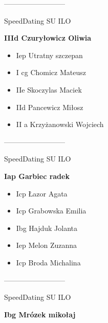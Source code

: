 \documentclass[a4paper,10pt]{article}
\begin{document}
\begin{multicols}{3}
\begin{minipage}[l]{\textwidth}
\begin{itemize}
    \end{itemize}



\end{minipage}



\begin{minipage}[l]{\textwidth}
--------------------------

  \footnotesize{SpeedDating SU ILO}

  \bfseries{IIId Czuryłowicz Oliwia}

  \begin{itemize}
    \item Iep Utratny szczepan
    \item I cg Chomicz Mateusz
    \item IIe Skoczylas Maciek
    \item IId Pancewicz Miłosz
    \item II a Krzyżanowski Wojciech

    \end{itemize}



\end{minipage}



\begin{minipage}[l]{\textwidth}
--------------------------

  \footnotesize{SpeedDating SU ILO}

  \bfseries{Iap Garbiec radek}

  \begin{itemize}
    \item Icp Łazor Agata
    \item Icp Grabowska Emilia
    \item Ibg Hajduk Jolanta
    \item Iep Melon Zuzanna
    \item Icp Broda Michalina

    \end{itemize}



\end{minipage}



\begin{minipage}[l]{\textwidth}
--------------------------

  \footnotesize{SpeedDating SU ILO}

  \bfseries{Ibg Mrózek mikołaj}


\end{minipage}
\end{multicols}
\end{document}
